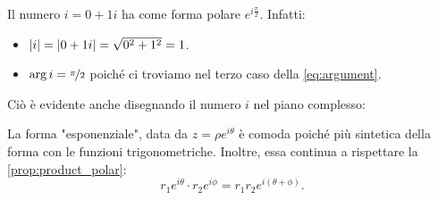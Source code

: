 \begin{example}
    Il numero $i = 0 + 1i$ ha come forma polare $e^{i\frac{\pi}{2}}$. Infatti: \begin{itemize}
        \item $\abs*{i} = \abs*{0 + 1i} = \sqrt{0^2 + 1^2} = 1$.
        \item $\arg i = \nicefrac{\pi}{2}$ poiché ci troviamo nel terzo caso della \eqref{eq:argument}.
    \end{itemize}

    Ciò è evidente anche disegnando il numero $i$ nel piano complesso:
    \begin{center}
    \end{center}
\end{example}

La forma "esponenziale", data da $z = \rho e^{i\theta}$ è comoda poiché più sintetica della forma con le funzioni trigonometriche. Inoltre, essa continua a rispettare la \autoref{prop:product_polar}: \[
    r_1e^{i\theta} \cdot r_2e^{i\phi} = r_1r_2 e^{i(\theta + \phi)}.    
\]

